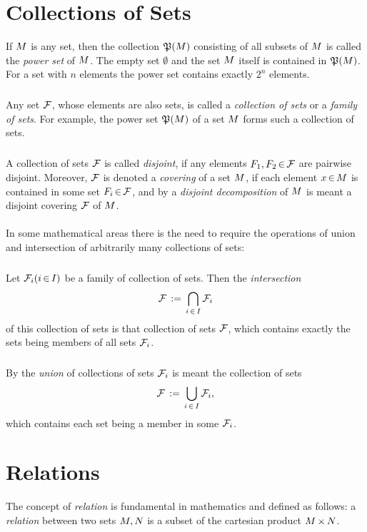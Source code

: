 \documentclass[11pt,twoside]{article}
\begin{document}
\section{Collections of Sets}
If $\setM$ is any set,
then the collection $\pot{M} $ consisting of all subsets of $\setM$
is called the \textit{power set} of $\setM$.
The empty set $\emptyset$ and the set $\setM$ itself
is contained in $\pot{\setM}$.
For a set with $n$ elements the power set contains exactly $2^n$ elements.

\subparagraph{}
Any set $\cal{F}$,
whose elements are also sets,
is called a \textit{collection of sets} or a \textit{family of sets}. 
For example,
the power set $\pot{\setM} $ of a set $\setM$
forms such a collection of sets.

\subparagraph{}
A collection of sets $\cal{F}$ is called \textit{disjoint},
if any elements $F_1, F_2 \xeof \cal{F}$ are pairwise disjoint.
Moreover, 
$\cal{F}$ is denoted a \textit{covering} of a set $\setM$,
if each element $x \xeof \setM$ is contained in some set $F_i \xeof \cal{F}$,
and by a \textit{disjoint decomposition} of $\setM$ is meant
a disjoint covering $\cal{F}$ of $\setM$.

\paragraph*{}
In some mathematical areas there is the need to require the operations of
union and intersection of arbitrarily many collections of sets:

\subparagraph{}
Let $\cal{F}_i (i \xeof I)$ be a family of collection of sets.
Then the \textit{intersection}
\[
\cal{F} \eqdef \bigcap_{i \xeof I} \cal{F}_i
\]
of this collection of sets is that collection of sets $\cal{F}$,
which contains exactly the sets being members
of all sets $\cal{F}_i$.

\subparagraph{}
By the \textit{union} of collections of sets $\cal{F}_i$
is meant the collection of sets
\[
\cal{F} \eqdef \bigcup_{i \xeof I} \cal{F}_i,
\]
which contains each set being a member in some $\cal{F}_i$.

\section{Relations}
The concept of \textit{relation} is fundamental in mathematics
and defined as follows:
a \textit{relation} between two sets $\setM,N$ is a subset of the 
cartesian product $\cross{M}{N}$. 
\end{document}
